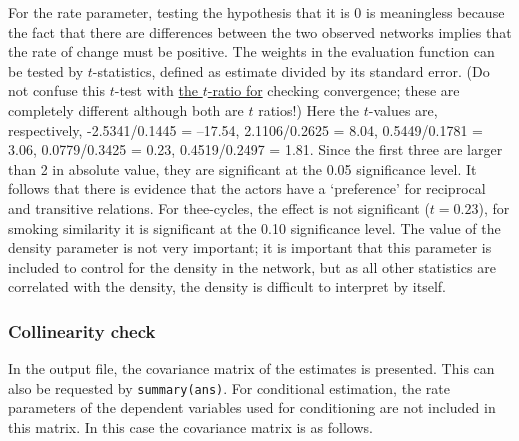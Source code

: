 \documentclass[a4paper,fleqn,11pt]{article}
\newcommand{\+}{\, + \,}
\begin{document}
 For the rate
parameter, testing the hypothesis that it is 0 is meaningless
because the fact that there are differences between the two observed
networks implies that the rate of change must be positive. The
weights in the evaluation function can be tested by $t$-statistics,
defined as estimate divided by its standard error. (Do not confuse
this $t$-test with \hyperlink{T_convergence}{the $t$-ratio for}
checking convergence; these are completely different although both
are $t$ ratios!) Here the $t$-values are, respectively,
 -2.5341/0.1445 = --17.54,
  2.1106/0.2625 = 8.04,
  0.5449/0.1781 = 3.06,
  0.0779/0.3425 = 0.23,
  0.4519/0.2497 = 1.81.
 Since the first three are larger than 2 in absolute value, they are
significant at the 0.05 significance level. It follows that there is
evidence that the actors have a `preference' for reciprocal
and transitive relations.
For thee-cycles, the effect is not significant ($t = 0.23$),
for smoking similarity it is significant at the 0.10 significance level.
The value of the density parameter is not very important; it is
important that this parameter is included to control for the density
in the network, but as all other statistics are correlated with the
density, the density is difficult to interpret by itself.

\subsubsection{Collinearity check}
\label{S_collinear}

In the output file, the covariance matrix
of the estimates is presented.
This can also be requested by \texttt{summary(ans)}.
For conditional estimation, the rate parameters of the dependent variables
used for conditioning are not included in this matrix.
In this case the covariance matrix is as follows.
\end{document}
